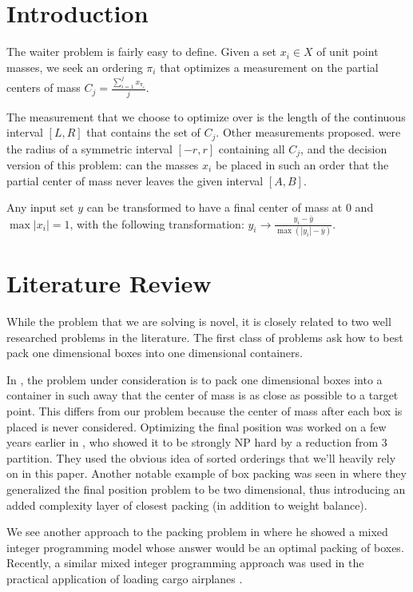 \section{Introduction}

The waiter problem is fairly easy to define.  Given a set $x_i \in X$ of unit point masses, we seek an ordering $\pi_i$ that optimizes a measurement on the partial centers of mass $C_j = \frac{\sum_{i=1}^j x_{\pi_i} }{ j }$. 

The measurement that we choose to optimize over is the length of the continuous interval $[L,R]$ that contains the set of $C_j$.  Other measurements proposed.  were the radius of a symmetric interval $[-r,r]$ containing all $C_j$, and the decision version of this problem: can the masses $x_i$ be placed in such an order that the partial center of mass never leaves the given interval $[A,B]$.  

Any input set $y$ can be transformed to have a final center of mass at 0 and  $\max |x_i| = 1$,  with the following transformation: $y_i \rightarrow \frac{y_i - \bar{y} }{\max(|y_i| - \bar{y}) }$.

\section{Literature Review}


While the problem that we are solving is novel, it is closely related to two well researched problems in the literature.  The first class of problems ask how to best pack one dimensional boxes into one dimensional containers.  

In \cite{mathur1998integer}, the problem under consideration is to pack one dimensional boxes into a container in such away that the center of mass is as close as possible to a target point.  This differs from our problem because the center of mass after each box is placed is never considered.  Optimizing the final position was worked on a few years earlier in \cite{amiouny1992balanced}, who showed it to be strongly NP hard by a reduction from 3 partition. They used the obvious idea of sorted orderings that we'll heavily rely on in this paper.  Another notable example of box packing was seen in \cite{davies1999weight} where they generalized the final position problem to be two dimensional, thus introducing an added complexity layer of closest packing (in addition to weight balance).

We see another approach to the packing problem in \cite{fasano2004mip} where he showed a mixed integer programming model whose answer would be an optimal packing of boxes.  Recently, a similar mixed integer programming approach was used in the practical application  of loading cargo airplanes \cite{limbourg2012automatic}.  

